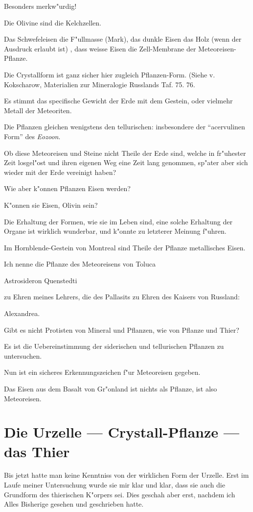 \documentclass[a4paper, 11pt, oneside, german]{article}
\begin{document}
Besonders merkw"urdig!

Die Olivine sind die Kelchzellen.

Das Schwefeleisen die F"ullmasse (Mark), das dunkle Eisen das Holz (wenn der Ausdruck erlaubt ist) , dass weisse Eisen die Zell-Membrane der Meteoreisen-Pflanze.

Die Crystallform ist ganz sicher hier zugleich Pflanzen-Form. (Siehe v. Kokscharow, Materialien zur Mineralogie Russlands Taf. 75. 76.

Es stimmt das specifische Gewicht der Erde mit dem Gestein, oder vielmehr Metall der Meteoriten.

Die Pflanzen gleichen wenigstens den tellurischen: insbesondere der "`acervulinen Form"' des \emph{Eozoon}.

Ob diese Meteoreisen und Steine nicht Theile der Erde sind, welche in fr"uhester Zeit losgel"ost und ihren eigenen Weg eine Zeit lang genommen, sp"ater aber sich wieder mit der Erde vereinigt haben?

Wie aber k"onnen Pflanzen Eisen werden?

K"onnen sie Eisen, Olivin sein?

Die Erhaltung der Formen, wie sie im Leben sind, eine solche Erhaltung der Organe ist wirklich wunderbar, und k"onnte zu letzterer Meinung f"uhren.

Im Hornblende-Gestein von Montreal sind Theile der Pflanze metallisches Eisen.

Ich nenne die Pflanze des Meteoreisens von Toluca

Astrosideron Quenstedti

zu Ehren meines Lehrers, die des Pallasits zu Ehren des Kaisers von Russland:

Alexandrea.

Gibt es nicht Protisten von Mineral und Pflanzen, wie von Pflanze und Thier?

Es ist die Uebereinstimmung der siderischen und tellurischen Pflanzen zu untersuchen.

Nun ist ein sicheres Erkennungszeichen f"ur Meteoreisen gegeben.

Das Eisen aus dem Basalt von Gr"onland ist nichts als Pflanze, ist also Meteoreisen.
\clearpage
\section{Die Urzelle --- Crystall-Pflanze --- das Thier}
\paragraph{}
Bis jetzt hatte man keine Kenntniss von der wirklichen Form der Urzelle. Erst im Laufe meiner Untersuchung wurde sie mir klar und klar, dass sie auch die Grundform des thierischen K"orpers sei. Dies geschah aber erst, nachdem ich Alles Bisherige gesehen und geschrieben hatte.
\end{document}
